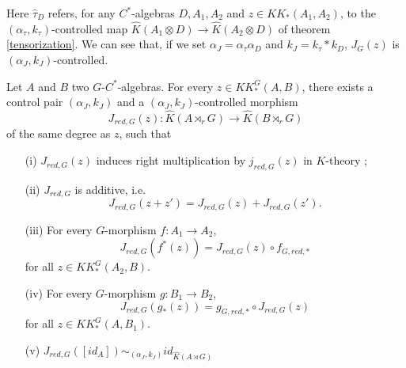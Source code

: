 Here $\hat\tau_D$ refers, for any $C^*$-algebras $D,A_1,A_2$ and $z\in KK_*(A_1,A_2)$, to the $(\alpha_\tau,k_\tau)$-controlled map $\hat K (A_1\otimes D )\rightarrow \hat K(A_2\otimes D)$ of theorem \ref{tensorization}. We can see that, if we set $\alpha_J=\alpha_\tau \alpha_D$ and $k_J=k_\tau * k_D$, $J_G(z)$ is $(\alpha_J,k_J)$-controlled.\\

\begin{prop}\label{Kasparov}
Let $A$ and $B$ two $G$-$C^*$-algebras. For every $z\in KK^G_*(A,B)$, there exists a control pair $(\alpha_J,k_J)$ and a $(\alpha_J,k_J)$-controlled morphism
\[J_{red,G}(z) : \hat K(A\rtimes_r G)\rightarrow \hat K(B\rtimes_r G)\]
of the same degree as $z$, such that
\begin{enumerate}
\item[(i)] $J_{red,G}(z)$ induces right multiplication by $j_{red,G}(z)$ in $K$-theory ;
\item[(ii)] $J_{red,G}$ is additive, i.e.
\[J_{red,G}(z+z')=J_{red,G}(z)+J_{red,G}(z').\]
\item[(iii)] For every $G$-morphism $f : A_1\rightarrow A_2$,
\[J_{red,G}(f^*(z))=J_{red,G}(z)\circ f_{G,red,*}\] for all $z\in KK_*^G(A_2,B)$.
\item[(iv)] For every $G$-morphism $g : B_1\rightarrow B_2$,
\[J_{red,G}(g_*(z))= g_{G,red,*}\circ J_{red,G}(z)\] for all $z\in KK_*^G(A,B_1)$.
\item[(v)] $J_{red,G}([id_A]) \sim_{(\alpha_J,k_J)} id_{\hat K(A\rtimes G)}$
\end{enumerate}
\end{prop}

